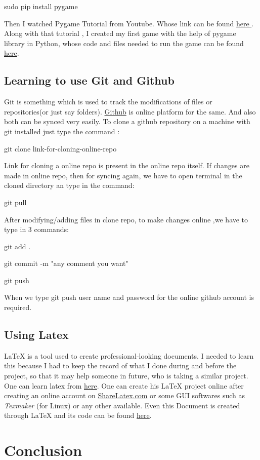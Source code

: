 \documentclass[12pt, letterpaper, twoside]{article}
\begin{document}
sudo pip install pygame

\noindent Then I watched Pygame Tutorial from Youtube. Whose link can be found 
\href{https://www.youtube.com/playlist?list=PL6gx4Cwl9DGAjkwJocj7vlc_mFU-4wXJq}{here
}. Along with that tutorial , I created my first game with the help of pygame 
library in Python, whose code and files needed to run the game can be found 
\href{http://github.com/pragati4721/LearningPygame/}{here}. 
\subsection{Learning to use Git and Github}
Git is something which is used to track the modifications of files or 
repositories(or just say folders).
\noindent\href{http://github.com}{Github} is online platform for the same. And also 
both can be synced very easily. To clone a github repository on a machine with git 
installed just type the command :

git clone link-for-cloning-online-repo

\noindent Link for cloning a online repo is present in the online repo itself. If 
changes are made in online repo, then for syncing again, we have to open terminal in 
the cloned directory an type in the command:

git pull

\noindent After modifying/adding files in clone repo, to make changes online ,we 
have to type in 3 commands:

git add .

git commit -m "any comment you want"

git push

\noindent When we type git push user name and password for the online github account 
is required.


\subsection{Using Latex}
\LaTeX{} is a tool used to create professional-looking documents. I needed to learn 
this because I had to keep the record of what I done during and before the project, 
so that it may help someone in future, who is taking a similar project. One can 
learn latex from \href{http://www.sharelatex.com/learn/}{here}. One can create his 
\LaTeX{} project online after  creating an online account on 
\href{http://www.sharelatex.com/}{ShareLatex.com} or some GUI softwares such as 
\emph{Texmaker} (for Linux) or any other available. Even this Document is created 
through \LaTeX{} and its code can be found 
\href{http://github.com/pragati4721/pygame-miniproject/Documentation}{here}.

\section{Conclusion}
\end{document}
